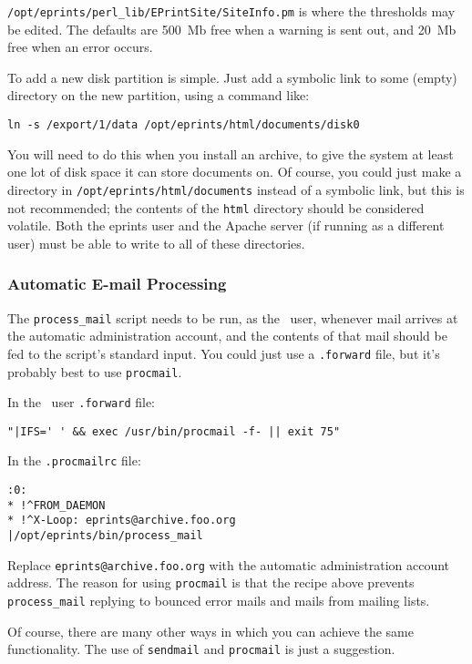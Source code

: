 {\tt /opt/eprints/perl\_lib/EPrintSite/SiteInfo.pm} is where the thresholds may be edited. The defaults are 500~Mb free when a warning is sent out, and 20~Mb free when an error occurs.

To add a new disk partition is simple. Just add a symbolic link to some (empty) directory on the new partition, using a command like:

\begin{verbatim}
ln -s /export/1/data /opt/eprints/html/documents/disk0
\end{verbatim}

You will need to do this when you install an \eprints archive, to give the system at least one lot of disk space it can store documents on. Of course, you could just make a directory in {\tt /opt/eprints/html/documents} instead of a symbolic link, but this is not recommended; the contents of the {\tt html} directory should be considered volatile. Both the eprints user and the Apache server (if running as a different user) must be able to write to all of these directories.


\subsubsection{Automatic E-mail Processing}

The {\tt process\_mail} script needs to be run, as the \eprints\ user, whenever mail arrives at the automatic administration account, and the contents of that mail should be fed to the script's standard input. You could just use a {\tt .forward} file, but it's probably best to use {\tt procmail}.

In the \eprints\ user {\tt .forward} file:

\begin{verbatim}
"|IFS=' ' && exec /usr/bin/procmail -f- || exit 75"
\end{verbatim}

In the {\tt .procmailrc} file:

\begin{verbatim}
:0:
* !^FROM_DAEMON
* !^X-Loop: eprints@archive.foo.org
|/opt/eprints/bin/process_mail
\end{verbatim}

Replace {\tt eprints@archive.foo.org} with the automatic administration account address. The reason for using {\tt procmail} is that the recipe above prevents {\tt process\_mail} replying to bounced error mails and mails from mailing lists.

Of course, there are many other ways in which you can achieve the same functionality. The use of {\tt sendmail} and {\tt procmail} is just a suggestion.


